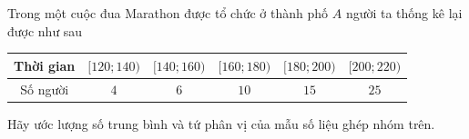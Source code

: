 \begin{ex}%
	Trong một cuộc đua Marathon được  tổ chức ở thành phố $A$ người ta thống kê lại được như sau
	\begin{center}
		\begin{tabular}{|c|c|c|c|c|c|}
			\hline Thời gian &$[120; 140)$  &$[140; 160)$ &$[160; 180)$ &$[180; 200)$ &$[200; 220)$ \\
			\hline Số người & $4$ & $6$ &  $10$ & $15$ & $25$ \\
			 \hline
		\end{tabular}
	\end{center}
	Hãy ước lượng số trung bình và tứ phân vị của mẫu số liệu ghép nhóm  trên.
\end{ex}

